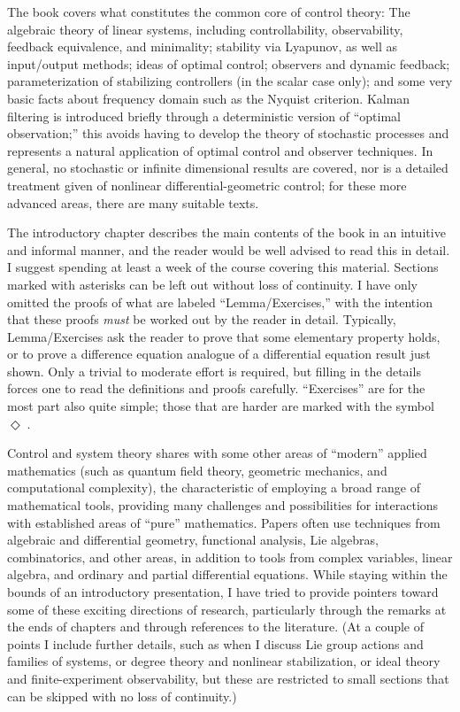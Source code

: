The book covers what constitutes the common core of control theory: The
algebraic theory of
linear systems, including controllability, observability, feedback
equivalence, and minimality; stability via Lyapunov, as well as input/output
methods; ideas of optimal control; observers and dynamic feedback;
parameterization of stabilizing controllers (in the scalar case only); and
some very basic facts about frequency domain such as the Nyquist criterion.
Kalman filtering is introduced briefly through a deterministic version of
``optimal observation;''  this avoids having to develop the theory of
stochastic processes and represents a natural application of optimal control
and observer techniques.  In general, no stochastic or infinite dimensional
results are covered, nor is a detailed treatment given of nonlinear
differential-geometric control; for these more advanced areas, there are
many suitable texts.

The introductory chapter describes the main contents of the book in an
intuitive and informal manner, and the reader would be well advised to read
this in detail.  I suggest spending at least a week of the course covering
this material.  Sections marked with asterisks can be left out without loss of
continuity.  I have only omitted the proofs of what are labeled
``Lemma/Exercises,'' with the intention that these proofs {\it must} be worked
out
by the reader in detail.  Typically, Lemma/Exercises ask the reader to prove
that some elementary property holds, or to prove a difference equation
analogue of a differential equation result just shown.  Only a trivial to
moderate effort is required, but filling in the details forces one to
read the definitions and proofs carefully. ``Exercises'' are for the most
part also quite simple; those that are harder are marked
\def\harder{$\Diamond\;$}
with the symbol \harder.
 
Control and system theory shares with some other areas of ``modern''
applied mathematics (such as quantum field theory, geometric mechanics, and
computational
complexity), the characteristic of employing a broad range of mathematical
tools, providing many challenges and possibilities for interactions with
established areas of ``pure'' mathematics.
Papers often use techniques from algebraic and differential geometry,
functional analysis, Lie algebras, combinatorics, and other areas, in addition
to tools from complex variables, linear algebra, and ordinary and partial
differential equations.  While staying within the bounds of an introductory
presentation, I have tried to provide pointers toward some of these exciting
directions of research, particularly through the remarks at the ends of
chapters and through
references to the literature.  (At a couple of points I include
further details, such as when I discuss Lie group actions and families of
systems, or degree theory and nonlinear stabilization, or ideal theory and
finite-experiment observability, but these are restricted to small sections
that can be skipped with no loss of continuity.)
 

